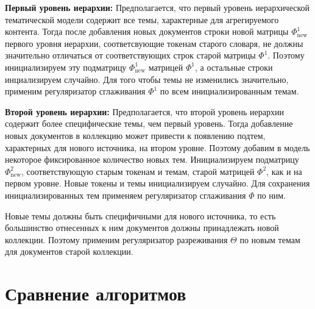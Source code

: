 \textbf{Первый уровень иерархии:}
Предполагается, что первый уровень иерархической тематической модели содержит все темы, характерные для агрегируемого контента. Тогда после добавления новых документов строки новой матрицы $\Phi^{1}_{\text{new}}$ первого уровня иерархии, соответсвующие токенам старого словаря, не должны значительно отличаться от соответствующих строк старой матрицы $\Phi^{1}$. Поэтому инициализируем эту подматрицу $\Phi^{1}_{\text{new}}$ матрицей $\Phi^{1}$, а остальные строки инциализируем случайно. Для того чтобы темы не изменились значительно, применим регуляризатор сглаживания $\Phi^{1}$ по всем инициализированным темам.

\textbf{Второй уровень иерархии:}
Предполагается, что второй уровень иерархии содержит более специфические темы, чем первый уровень. Тогда добавление новых документов в коллекцию может привести к появлению подтем, характерных для нового источника, на втором уровне. Поэтому добавим в модель некоторое фиксированное количество новых тем. Инициализируем подматрицу $\Phi^{2}_{\text{new}}$, соответствующую старым токенам и темам, старой матрицей $\Phi^{2}$, как и на первом уровне. Новые токены и темы инициализируем случайно. Для сохранения инициализированных тем применяем регуляризатор сглаживания $\Phi$ по ним.

Новые темы должны быть специфичными для нового источника, то есть большинство отнесенных к ним документов должны принадлежать новой коллекции. Поэтому применим регуляризатор разреживания $\Theta$ по новым темам для документов старой коллекции.

\section{Сравнение алгоритмов}
